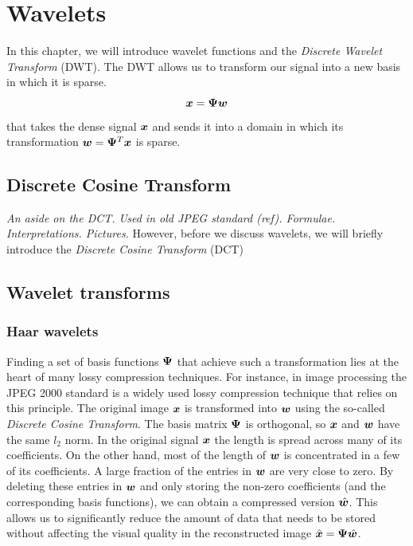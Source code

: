 \chapter{Wavelets}
\label{ch:dwt}
In this chapter, we will introduce wavelet functions and the \emph{Discrete Wavelet Transform} (DWT).
The DWT allows us to transform our signal into a new basis in which it is sparse.
\begin{equation}
\boldsymbol x = \boldsymbol \Psi \boldsymbol w
\end{equation}
that takes the dense signal $\boldsymbol x$ and sends it into a domain in which its transformation $\boldsymbol w = \boldsymbol \Psi^T \boldsymbol x$ is sparse.

\section{Discrete Cosine Transform}
\emph{An aside on the DCT. Used in old JPEG standard (ref). Formulae. Interpretations. Pictures.}
However, before we discuss wavelets, we will briefly introduce the \emph{Discrete Cosine Transform} (DCT)

\section{Wavelet transforms}
\subsection{Haar wavelets}
Finding a set of basis functions $\boldsymbol\Psi$ that achieve such a transformation lies at the heart of many lossy compression techniques.
For instance, in image processing the JPEG 2000 standard is a widely used lossy compression technique that relies on this principle.
The original image $\boldsymbol x$ is transformed into $\boldsymbol w$ using the so-called \emph{Discrete Cosine Transform}.
The basis matrix $\boldsymbol \Psi$ is orthogonal, so $\boldsymbol x$ and $\boldsymbol w$ have the same $l_2$ norm.
In the original signal $\boldsymbol x$ the length is spread across many of its coefficients.
On the other hand, most of the length of $\boldsymbol w$ is concentrated in a few of its coefficients.
A large fraction of the entries in $\boldsymbol w$ are very close to zero. 
By deleting these entries in $\boldsymbol w$ and only storing the non-zero coefficients (and the corresponding basis functions), we can obtain a compressed version $\hat{\boldsymbol w}$. 
This allows us to significantly reduce the amount of data that needs to be stored without affecting the visual quality in the reconstructed image $\hat{\boldsymbol x} = \boldsymbol\Psi\hat{\boldsymbol w}$.

